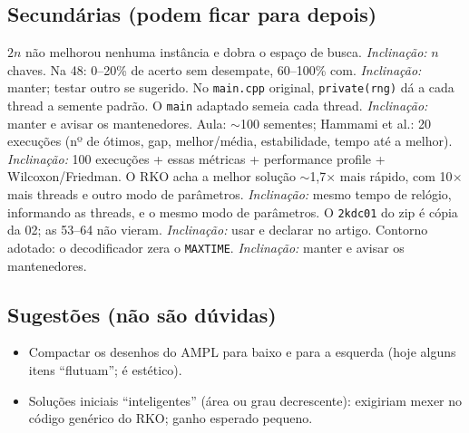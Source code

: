\documentclass[11pt,a4paper]{article}
\begin{document}
\subsection{Secundárias (podem ficar para depois)}
{\color{cinza}\small
{}
$2n$ não melhorou nenhuma instância e dobra o espaço de busca. \emph{Inclinação:} $n$ chaves.
\respostacurta
{}
Na 48: 0--20\% de acerto sem desempate, 60--100\% com. \emph{Inclinação:} manter; testar outro se sugerido.
\respostacurta
{}
No \texttt{main.cpp} original, \texttt{private(rng)} dá a cada thread a semente padrão. O \texttt{main} adaptado
semeia cada thread. \emph{Inclinação:} manter e avisar os mantenedores.
\respostacurta
{}
Aula: $\sim$100 sementes; Hammami et al.: 20 execuções (nº de ótimos, gap, melhor/média, estabilidade, tempo
até a melhor). \emph{Inclinação:} 100 execuções + essas métricas + performance profile + Wilcoxon/Friedman.
\respostacurta
{}
O RKO acha a melhor solução $\sim$1,7$\times$ mais rápido, com 10$\times$ mais threads e outro modo de
parâmetros. \emph{Inclinação:} mesmo tempo de relógio, informando as threads, e o mesmo modo de parâmetros.
\respostacurta
{}
O \texttt{2kdc01} do zip é cópia da 02; as 53--64 não vieram. \emph{Inclinação:} usar e declarar no artigo.
\respostacurta
{}
Contorno adotado: o decodificador zera o \texttt{MAXTIME}. \emph{Inclinação:} manter e avisar os mantenedores.
\respostacurta
}

\subsection*{Sugestões (não são dúvidas)}
\begin{itemize}[leftmargin=*,itemsep=1pt]
\item Compactar os desenhos do AMPL para baixo e para a esquerda (hoje alguns itens ``flutuam''; é estético).
\item Soluções iniciais ``inteligentes'' (área ou grau decrescente): exigiriam mexer no código genérico do RKO; ganho esperado pequeno.
\end{itemize}
\end{document}
